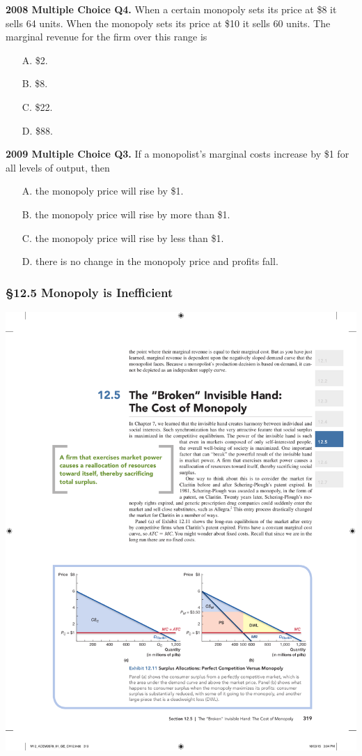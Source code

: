 \documentclass[12pt, xcolor=dvipsnames]{beamer}
\begin{document}
\begin{frame}
\small \textsf{\bfseries 2008 Multiple Choice Q4.} 
When a certain monopoly sets its price at \$8 it sells 64 units. When the monopoly sets its price at \$10 it sells 60 units. The marginal revenue for the firm over this range is
\begin{enumerate}\itemsep-0.5ex 
\item[A.] \$2.
\item[B.] \$8.
\item[C.] \$22.
\item[D.] \$88.
\end{enumerate}
\end{frame}



\begin{frame}
\small \textsf{\bfseries 2009 Multiple Choice Q3.} 
If a monopolist's marginal costs increase by \$1 for all levels of output, then
\begin{enumerate}\itemsep-0.5ex 
\item[A.] the monopoly price will rise by \$1.
\item[B.] the monopoly price will rise by more than \$1.
\item[C.] the monopoly price will rise by less than \$1.
\item[D.] there is no change in the monopoly price and profits fall.
\end{enumerate}
\end{frame}



\begin{frame}
\frametitle{\bf §12.5 Monopoly is Inefficient}
\begin{center}
\includegraphics[width=.9\linewidth]{figures/11.pdf}
\end{center}
\end{frame}
\end{document}

